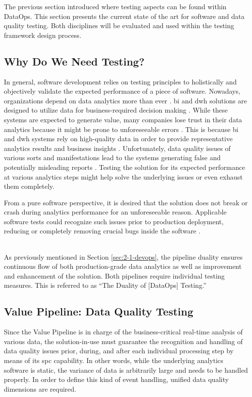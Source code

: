 The previous section introduced where testing aspects can be found within DataOps. This section presents the current state of the art for software and data quality testing. Both disciplines will be evaluated and used within the testing framework design process.

\subsection{Why Do We Need Testing?}
In general, software development relies on testing principles to holistically and objectively validate the expected performance of a piece of software. Nowadays, organizations depend on data analytics more than ever \cite{Munawar2011}. \ac{bi} and \ac{dwh} solutions are designed to utilize data for business-required decision making \cite{Souibgui2019}. While these systems are expected to generate value, many companies lose trust in their data analytics because it might be prone to unforeseeable errors \cite{BISurvey.com}. This is because \ac{bi} and \ac{dwh} systems rely on high-quality data in order to provide representative analytics results and business insights \cite{Munawar2011}. Unfortunately, data quality issues of various sorts and manifestations lead to the systems generating false and potentially misleading reports \cite{Munawar2011}\cite{Freudiger2014}\cite{Redman2016}. Testing the solution for its expected performance at various analytics steps might help solve the underlying issues or even exhaust them completely. 

From a pure software perspective, it is desired that the solution does not break or crash during analytics performance for an unforeseeable reason. Applicable software tests could recognize such issues prior to production deployment, reducing or completely removing crucial bugs inside the software \cite[105\psqq]{ORegan2017}. \\\

As previously mentioned in Section \ref{sec:2-1-devops}, the pipeline duality ensures continuous flow of both production-grade data analytics as well as improvement and enhancement of the solution. Both pipelines require individual testing measures. This is referred to as \enquote{The Duality of [DataOps] Testing.} \cite[40\psqq]{Bergh2019}

\subsection{Value Pipeline: Data Quality Testing} \label{sec:2-2-value-pipeline}
Since the Value Pipeline is in charge of the business-critical real-time analysis of various data, the solution-in-use must guarantee the recognition and handling of data quality issues prior, during, and after each individual processing step by means of its \ac{spc} capability. In other words, while the underlying analytics software is static, the variance of data is arbitrarily large and needs to be handled properly. In order to define this kind of event handling, unified data quality dimensions are required.

